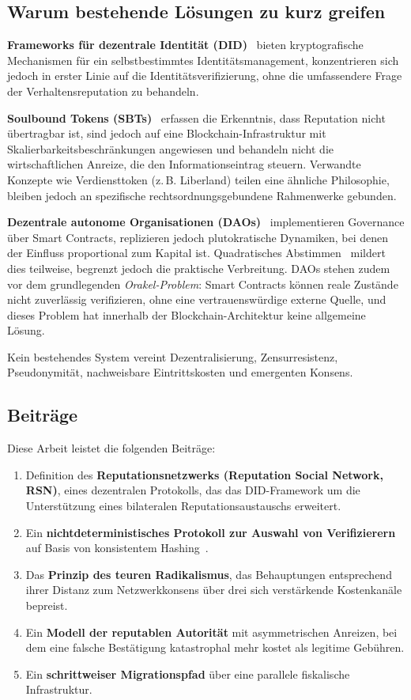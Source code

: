 \documentclass[11pt,a4paper,twocolumn]{article}
\begin{document}
\subsection{Warum bestehende Lösungen zu kurz greifen}

\textbf{Frameworks für dezentrale Identität (DID)}~\cite{did2022} bieten kryptografische Mechanismen für ein selbstbestimmtes Identitätsmanagement, konzentrieren sich jedoch in erster Linie auf die Identitätsverifizierung, ohne die umfassendere Frage der Verhaltensreputation zu behandeln.

\textbf{Soulbound Tokens (SBTs)}~\cite{weyl2022} erfassen die Erkenntnis, dass Reputation nicht übertragbar ist, sind jedoch auf eine Blockchain-Infrastruktur mit Skalierbarkeitsbeschränkungen angewiesen und behandeln nicht die wirtschaftlichen Anreize, die den Informationseintrag steuern. Verwandte Konzepte wie Verdiensttoken (z.\,B. Liberland) teilen eine ähnliche Philosophie, bleiben jedoch an spezifische rechtsordnungsgebundene Rahmenwerke gebunden.

\textbf{Dezentrale autonome Organisationen (DAOs)}~\cite{buterin2014} implementieren Governance über Smart Contracts, replizieren jedoch plutokratische Dynamiken, bei denen der Einfluss proportional zum Kapital ist. Quadratisches Abstimmen~\cite{buterin2019} mildert dies teilweise, begrenzt jedoch die praktische Verbreitung. DAOs stehen zudem vor dem grundlegenden \emph{Orakel-Problem}: Smart Contracts können reale Zustände nicht zuverlässig verifizieren, ohne eine vertrauenswürdige externe Quelle, und dieses Problem hat innerhalb der Blockchain-Architektur keine allgemeine Lösung.

Kein bestehendes System vereint Dezentralisierung, Zensurresistenz, Pseudonymität, nachweisbare Eintrittskosten und emergenten Konsens.

\subsection{Beiträge}

Diese Arbeit leistet die folgenden Beiträge:
\begin{enumerate}[nosep]
\item Definition des \textbf{Reputationsnetzwerks (Reputation Social Network, RSN)}, eines dezentralen Protokolls, das das DID-Framework um die Unterstützung eines bilateralen Reputationsaustauschs erweitert.
\item Ein \textbf{nichtdeterministisches Protokoll zur Auswahl von Verifizierern} auf Basis von konsistentem Hashing~\cite{karger1997}.
\item Das \textbf{Prinzip des teuren Radikalismus}, das Behauptungen entsprechend ihrer Distanz zum Netzwerkkonsens über drei sich verstärkende Kostenkanäle bepreist.
\item Ein \textbf{Modell der reputablen Autorität} mit asymmetrischen Anreizen, bei dem eine falsche Bestätigung katastrophal mehr kostet als legitime Gebühren.
\item Ein \textbf{schrittweiser Migrationspfad} über eine parallele fiskalische Infrastruktur.
\end{enumerate}
\end{document}
